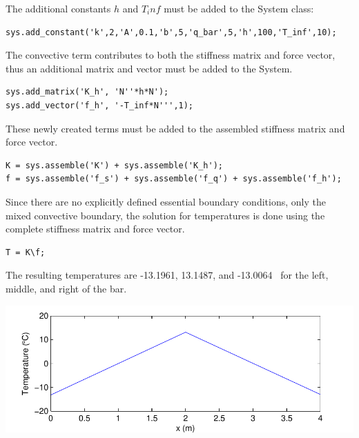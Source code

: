 The additional constants $h$ and $T_inf$ must be added to the System class:
\begin{lstlisting}
sys.add_constant('k',2,'A',0.1,'b',5,'q_bar',5,'h',100,'T_inf',10); 
\end{lstlisting}

The convective term contributes to both the stiffness matrix and force vector, thus an additional matrix and vector must be added to the System.
\begin{lstlisting}
sys.add_matrix('K_h', 'N''*h*N');
sys.add_vector('f_h', '-T_inf*N''',1);
\end{lstlisting}

These newly created terms must be added to the assembled stiffness matrix and force vector.
\begin{lstlisting}
K = sys.assemble('K') + sys.assemble('K_h');
f = sys.assemble('f_s') + sys.assemble('f_q') + sys.assemble('f_h');
\end{lstlisting}

Since there are no explicitly defined essential boundary conditions, only the mixed convective boundary, the solution for temperatures is done using the complete stiffness matrix and force vector.
\begin{lstlisting}
T = K\f;
\end{lstlisting}

The resulting temperatures are -13.1961, 13.1487, and -13.0064 \C ~for the left, middle, and right of the bar.
\begin{center}
\includegraphics{HW2/HW2-2/soln.pdf}
\end{center}